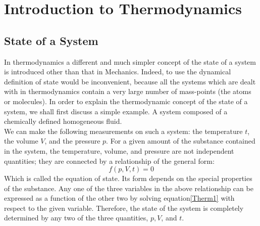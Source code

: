 
\chapter{Introduction to Thermodynamics}
\section{State of a System}
In thermodynamics a different and much simpler concept of the state of a system is introduced other than that in Mechanics. Indeed, to use the dynamical definition of state would be inconvenient, because all the systems which are dealt with in thermodynamics contain a very large number of mass-points (the atoms or molecules). In order to explain the thermodynamic concept of the state of a system, we shall first discuss a simple example. A system composed of a chemically defined homogeneous fluid.\\ We can make the following measurements on such a system: the temperature $t$, the volume $V$, and the pressure $p$. For a given amount of the substance contained in the system, the temperature, volume, and pressure are not independent quantities; they are connected by a relationship of the general form:
\begin{equation}
f(p, V, t)=0
\end{equation}\label{Therm1}
Which is called the equation of state. Its form depends on the special properties of the substance. Any one of the three variables in the above relationship can be expressed as a function of the other two by solving equation\ref{Therm1} with respect to the given variable. Therefore, the state of the system is completely determined by any two of the three quantities, $p, V$, and $t$.